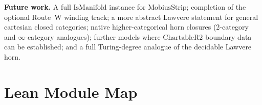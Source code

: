 \documentclass[11pt]{article}
\begin{document}
\medskip
\noindent\textbf{Future work.} A full $\mathrm{IsManifold}$ instance for
$\mathrm{MobiusStrip}$; completion of the optional Route~W winding track; a more
abstract Lawvere statement for general cartesian closed categories; native
higher-categorical horn closures (2-category and $\infty$-category analogues);
further models where $\mathrm{ChartableR2}$ boundary data can be established;
and a full Turing-degree analogue of the decidable Lawvere horn.

\appendix

\section{Lean Module Map}
\label{app:modules}
\end{document}
